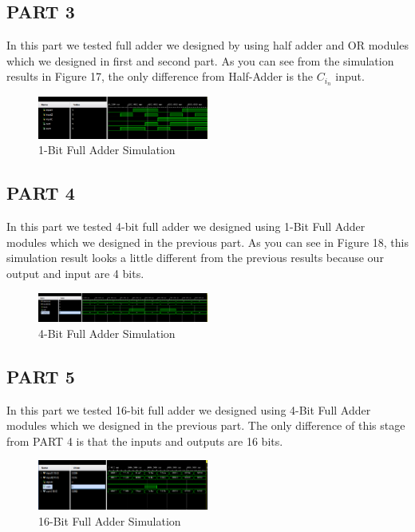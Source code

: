 \documentclass[pdftex,12pt,a4paper]{article}
\begin{document}
\subsection{PART 3}
In this part we tested full adder we designed by using half adder and OR modules which we designed in first and second part. As you can see from the simulation results in Figure 17, the only difference from Half-Adder is the $C_i_n$ input.

\begin{figure}[H]
    \centering
    \includegraphics[width=0.5\textwidth]{fulladder_sim.png}
    \caption{1-Bit Full Adder Simulation}
\end{figure}

\subsection{PART 4}

In this part we tested 4-bit full adder we designed using 1-Bit Full Adder modules which we designed in the previous part. As you can see in Figure 18, this simulation result looks a little different from the previous results because our output and input are 4 bits.


\begin{figure}[H]
    \centering
    \includegraphics[width=0.5\textwidth]{fulladder4bit_sim.png}
    \caption{4-Bit Full Adder Simulation}
\end{figure}

\subsection{PART 5}

In this part we tested 16-bit full adder we designed using 4-Bit Full Adder modules which we designed in the previous part. The only difference of this stage from PART 4 is that the inputs and outputs are 16 bits.


\begin{figure}[H]
    \centering
    \includegraphics[width=0.5\textwidth]{fulladder16bit_sim.png}
    \caption{16-Bit Full Adder Simulation}
\end{figure}
\newpage
\end{document}
